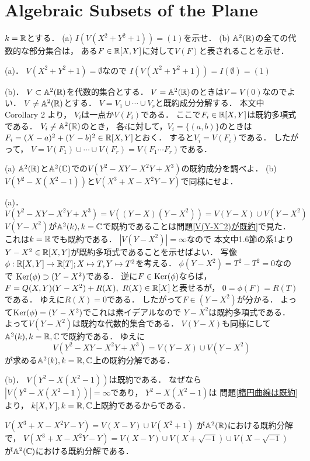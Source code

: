 \section{Algebraic Subsets of the Plane}

\begin{prob}
  $k=\mathbb{R}$とする．
  (a) $I(V(X^2+Y^2+1)) = (1)$を示せ．
  (b) $\mathbb{A}^2(\mathbb{R})$の全ての代数的な部分集合は，
  ある$F\in\mathbb{R}[X,Y]$に対して$V(F)$と表されることを示せ．
\end{prob}
\begin{ans}
  (a)．
  $V(X^2+Y^2+1) = \emptyset$なので
  $I(V(X^2+Y^2+1)) = I(\emptyset) = (1)$

  (b)．
  $V\subset \mathbb{A}^2(\mathbb{R})$を代数的集合とする．
  $V = \mathbb{A}^2(\mathbb{R})$のときは$V = V(0)$なのでよい．
  $V \ne \mathbb{A}^2(\mathbb{R})$とする．
  $V = V_1 \cup \cdots \cup V_r$と既約成分分解する．
  本文中 Corollary 2 より，
  $V_i$は一点か$V(F_i)$である．
  ここで$F_i \in \mathbb{R}[X,Y]$は既約多項式である．
  $V_i \ne \mathbb{A}^2(\mathbb{R})$のとき，
  各$i$に対して，$V_i = \{ (a,b) \}$のときは
  $F_i = (X-a)^2 + (Y-b)^2 \in \mathbb{R}[X,Y]$とおく．
  すると$V_i = V(F_i)$である．
  したがって，
  $V = V(F_1) \cup \cdots \cup V(F_r) = V( F_1 \cdots F_r )$である．
\end{ans}

\begin{prob}
  (a) $\mathbb{A}^2(\mathbb{R})$と$\mathbb{A}^2(\mathbb{C})$での$V(Y^2-XY-X^2Y+X^3)$の既約成分を調べよ．
  (b) $V(Y^2-X(X^2-1))$と$V(X^3+X-X^2Y-Y)$で同様にせよ．
\end{prob}
\begin{ans}
  (a)．
  $V(Y^2-XY-X^2Y+X^3)
  = V( (Y-X)(Y-X^2) )
  = V(Y-X) \cup V(Y-X^2)$
  $V(Y-X^2)$が$\mathbb{A}^2(k), k=\mathbb{C}$で既約であることは問題\ref{V(Y-X^2)が既約}で見た．
  これは$k=\mathbb{R}$でも既約である．
  $|V(Y-X^2)| = \infty$なので
  本文中1.6節の系1より
  $Y-X^2 \in \mathbb{R}[X,Y]$が既約多項式であることを示せばよい．
  写像$\phi : \mathbb{R}[X,Y] \to \mathbb{R}[T]; X \mapsto T, Y \mapsto T^2$を考える．
  $\phi(Y-X^2) = T^2 - T^2 = 0$なので
  $\mathrm{Ker}( \phi ) \supset (Y-X^2)$である．
  逆に$ F \in \mathrm{Ker}( \phi )$ならば，
  $F = Q(X,Y)(Y-X^2) + R(X), \ R(X) \in \mathbb{R}[X]$と表せるが，
  $0 = \phi(F) = R(T)$である．
  ゆえに$R(X) = 0$である．
  したがって$F \in (Y-X^2)$が分かる．
  よって$\mathrm{Ker}(\phi) = (Y-X^2)$でこれは素イデアルなので
  $Y-X^2$は既約多項式である．
  よって$V(Y-X^2)$は既約な代数的集合である．
  $V(Y-X)$も同様にして
  $\mathbb{A}^2(k), k=\mathbb{R},\mathbb{C}$で既約である．
  ゆえに
  \[ V(Y^2-XY-X^2Y+X^3) = V(Y-X) \cup V(Y-X^2) \]
  が求める$\mathbb{A}^2(k), k=\mathbb{R},\mathbb{C}$上の既約分解である．

  (b)．
  $V(Y^2 - X(X^2-1))$は既約である．
  なぜなら$|V(Y^2 - X(X^2-1))| = \infty$であり，
  $Y^2 - X(X^2-1)$は
  問題\ref{楕円曲線は既約}より，
  $k[X,Y], k=\mathbb{R},\mathbb{C}$上既約であるからである．
  
  $V(X^3+X-X^2Y-Y) = V(X-Y) \cup V(X^2+1)$
  が$\mathbb{A}^2(\mathbb{R})$における既約分解で，
  $V(X^3+X-X^2Y-Y) = V(X-Y) \cup V(X+\sqrt{-1}) \cup V(X-\sqrt{-1})$
  が$\mathbb{A}^2(\mathbb{C})$における既約分解である．
\end{ans}
